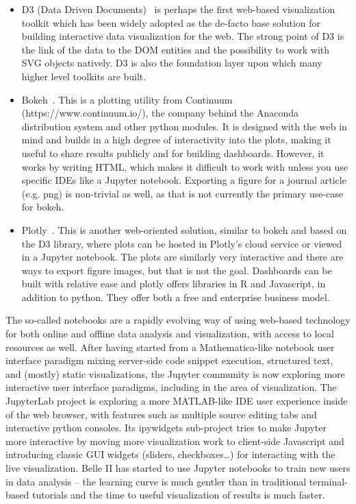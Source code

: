 \documentclass[12pt,a4paper]{article}
\begin{document}
\begin{itemize}
\item D3 (Data Driven Documents)~\cite{D32011} is perhaps the first web-based visualization toolkit which has been widely
adopted as the de-facto base solution for building interactive data visualization for the web. The strong point of D3 is the
link of the data to the DOM entities and the possibility to work with SVG objects natively. D3 is also the foundation layer
upon which many higher level toolkits are built.

\item Bokeh~\cite{Bokeh2014}. This is a plotting utility from Continuum (https://www.continuum.io/), the company behind the
Anaconda distribution system and other python modules. It is designed with the web in mind and builds in a high degree of
interactivity into the plots, making it useful to share results publicly and for building dashboards. However, it works by
writing HTML, which makes it difficult to work with unless you use specific IDEs like a Jupyter notebook. Exporting a figure
for a journal article (e.g. png) is non-trivial as well, as that is not currently the primary use-case for bokeh.

\item Plotly~\cite{Plotly2015}. This is another web-oriented solution, similar to bokeh and based on the D3 library, where plots
can be hosted in Plotly’s cloud service or viewed in a Jupyter notebook. The plots are similarly very interactive and there
are ways to export figure images, but that is not the goal. Dashboards can be built with relative ease and plotly offers
libraries in R and Javascript, in addition to python. They offer both a free and enterprise business model.
\end{itemize}

The so-called notebooks are a rapidly evolving way of using web-based technology for both online and offline data analysis and
visualization, with access to local resources as well. After having started from a Mathematica-like notebook user interface
paradigm mixing server-side code snippet execution, structured text, and (mostly) static visualizations, the Jupyter community
is now exploring more interactive user interface paradigms, including in the area of visualization. The JupyterLab project is
exploring a more MATLAB-like IDE user experience inside of the web browser, with features such as multiple source editing tabs
and interactive python consoles. Its ipywidgets sub-project tries to make Jupyter more interactive by moving more visualization
work to client-side Javascript and introducing classic GUI widgets (sliders, checkboxes…) for interacting with the live visualization.
Belle II has started to use Jupyter notebooks to train new users in data analysis – the learning curve is much gentler than in
traditional terminal-based tutorials and the time to useful visualization of results is much faster.
\end{document}

